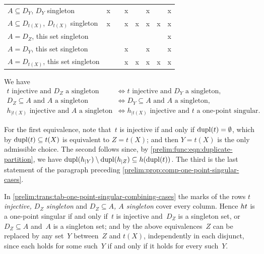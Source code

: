 \begin{table}[htb]
{\begin{tabular}{@{}lccccccc@{}}
			$A \subseteq D_Y$, $D_Y$ singleton                    & x &   & x &   & x &   & x \\
			$A \subseteq D_{t(X)}$, $D_{t(X)}$ singleton          & x &   & x & x & x & x & x \\
			\midrule
			$A = D_Z$, this set singleton                         &   &   &   &   &   &   & x \\
			$A = D_Y$, this set singleton                         &   &   & x &   & x &   & x \\
			$A = D_{t(X)}$, this set singleton                    &   &   & x & x & x & x & x \\
			\bottomrule
	\end{tabular}}
\end{table}

\begin{remark} \label{prelim:trans:rem:equivalences-one-point-sing}
	We have
	\begin{align*}
		\text{$t$ injective and $D_Z$ a singleton}
		& \Leftrightarrow \text{$t$ injective and $D_Y$ a singleton,} \\
		\text{$D_Z \subseteq A$ and $A$ a singleton}
		& \Leftrightarrow \text{$D_Y \subseteq A$ and $A$ a singleton,} \\
		\text{$h_{|t(X)}$ injective and $A$ a singleton}
		& \Leftrightarrow \text{$h_{|t(X)}$ injective and~$t$ a one-point singular.}
	\end{align*}
	
	For the first equivalence, note that~$t$ is injective if and only if
	$\dupl{t} = \emptyset$, which by $\dupl{t} \subseteq t(X)$ is equivalent to
	$Z = t(X)$; and then $Y = t(X)$ is the only admissible choice.
	The second follows since, by \cref{prelim:func:eqn:duplicate-partition}, we
	have $\dupl{h_{|Y}} \setminus \dupl{h_{|Z}} \subseteq h(\dupl{t})$.
	The third is the last statement of the paragraph preceding
	\cref{prelim:prop:comp-one-point-singular-cases}.
	
	In \cref{prelim:trans:tab-one-point-singular-combining-cases} the marks of the
	rows \emph{$t$ injective, $D_Z$ singleton} and
	\emph{$D_Z \subseteq A$, $A$ singleton} cover every column. Hence
	$\concat{t}{h}$ is a one-point singular if and only if~$t$ is injective
	and~$D_Z$ is a singleton set, or $D_Z \subseteq A$ and~$A$ is a singleton set;
	and by the above equivalences~$Z$ can be replaced by any set~$Y$ between~$Z$
	and $t(X)$, independently in each disjunct, since each holds for some such~$Y$
	if and only if it holds for every such~$Y$.
	

\end{remark}
